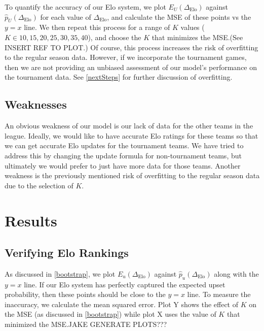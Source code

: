 \documentclass{article}
\begin{document}
To quantify the accuracy of our Elo system, we plot $E_U(\Delta_{\text{Elo}})$ against $\hat{p}_U(\Delta_{\text{Elo}})$ for each value of $\Delta_{\text{Elo}}$, and calculate the MSE of these points vs the $y=x$ line. We then repeat this process for a range of $K$ values ($K \in {10, 15, 20, 25, 30, 35, 40}$), and choose the $K$ that minimizes the MSE.\@ (See INSERT REF TO PLOT.) Of course, this process increases the risk of overfitting to the regular season data. However, if we incorporate the tournament games, then we are not providing an unbiased assessment of our model's performance on the tournament data. See \autoref{nextSteps} for further discussion of overfitting.

\subsection{Weaknesses}
An obvious weakness of our model is our lack of data for the other teams in the league. Ideally, we would like to have accurate Elo ratings for these teams so that we can get accurate Elo updates for the tournament teams. We have tried to address this by changing the update formula for non-tournament teams, but ultimately we would prefer to just have more data for those teams. Another weakness is the previously mentioned risk of overfitting to the regular season data due to the selection of $K$.

\section{Results}


\subsection{Verifying Elo Rankings}
As discussed in \autoref{bootstrap}, we plot $E_u(\Delta_{\text{Elo}})$ against $\hat{p}_u(\Delta_{\text{Elo}})$ along with the $y=x$ line. If our Elo system has perfectly captured the expected upset probability, then these points should be close to the $y=x$ line. To measure the inaccuracy, we calculate the mean squared error. Plot Y shows the effect of $K$ on the MSE (as discussed in \autoref{bootstrap}) while plot X uses the value of $K$ that minimized the MSE.\@ JAKE GENERATE PLOTS???
\end{document}
